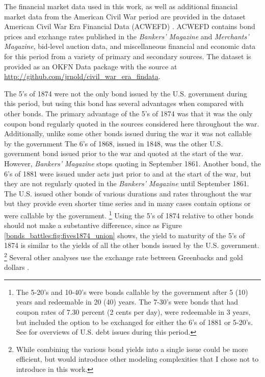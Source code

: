 The financial market data used in this work, as well as additional financial market data from the American Civil War period are provided in the dataset American Civil War Era Financial Data (ACWEFD) \parencite{Arnold2015a}.
ACWEFD contains bond prices and exchange rates published in the \textit{Bankers' Magazine} and \textit{Merchants' Magazine}, bid-level auction data, and miscellaneous financial and economic data for this period from a variety of primary and secondary sources.
The dataset is provided as an OKFN Data package with the source at \url{http://github.com/jrnold/civil_war_era_findata}.

The 5's of 1874 were not the only bond issued by the U.S. government during this period, but using this bond has several advantages when compared with other bonds.
The primary advantage of the 5's of 1874 was that it was the only coupon bond regularly quoted in the sources considered here throughout the war.
Additionally, unlike some other bonds issued during the war it was not callable by the government
The 6's of 1868, issued in 1848, was the other U.S. government bond issued prior to the war and quoted at the start of the war.
However, \textit{Bankers' Magazine} stops quoting in September 1861.
Another bond, the  6's of 1881 were issued under acts just prior to and at the start of the war, but they are not regularly quoted in the \textit{Bankers' Magazine} until September 1861.
The U.S. issued other bonds of various durations and rates throughout the war but they provide even shorter time series and in many cases contain options or were callable by the government.
\footnote{
The 5-20's and 10-40's were bonds callable by the government after 5 (10) years and redeemable in 20 (40) years.
The 7-30's were bonds that had coupon rates of 7.30 percent (2 cents per day), were redeemable in 3 years, but included the option to be exchanged for either the 6's of 1881 or 5-20's.
See \textcites{Bayley1882}{DeKnight1900}[297--309]{HomerSylla2005} for overviews of U.S. debt issues during this period.
}
Using the 5's of 1874 relative to other bonds should not make a substantive difference, since as Figure \ref{bonds_battles:fig:fives1874_union} shows, the yield to maturity of the 5's of 1874 is similar to the yields of all the other bonds issued by the U.S. government.
\footnote{
  While combining the various bond yields into a single issue could be more efficient, but would introduce other modeling complexities that I chose not to introduce in this work.
}
Several other analyses use the exchange rate between Greenbacks and gold dollars \parencites{McCandless1996}{WillardGuinnaneEtAl1996}{SmithSmith1997}.
